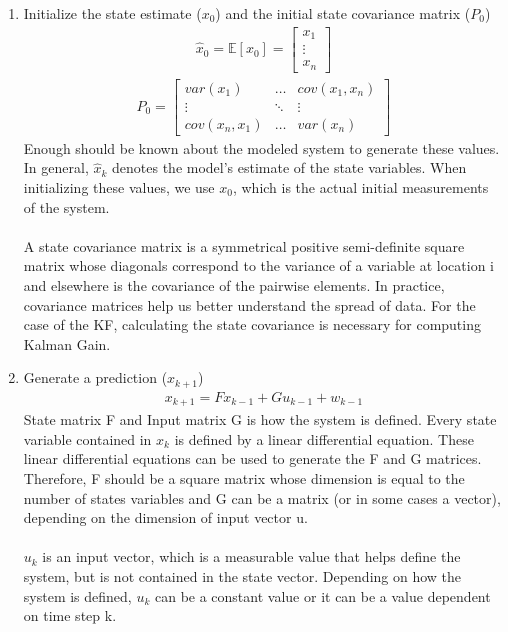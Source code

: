 \begin{enumerate}
  \item Initialize the state estimate ($x_0$) and the initial state covariance matrix ($P_0$) 
    \begin{align*}
       \hat x_0 = \mathbb{E}[x_0]  = \begin{bmatrix}
           x_1 \\
           \vdots \\
           x_n 
         \end{bmatrix} 
    \end{align*}
  \begin{align*}
      P_0 =
      \begin{bmatrix}
           var(x_1)  & \hdots & cov(x_1,x_n) \\
           \vdots & \ddots & \vdots \\
           cov(x_n, x_1)  & \hdots & var(x_n )
         \end{bmatrix} 
  \end{align*}
  Enough should be known about the modeled system to generate these values. In general, $\hat x_k$ denotes the model's estimate of the state variables. When initializing these values, we use $x_0$, which is the actual initial measurements of the system. \\ \\
   A state covariance matrix is a symmetrical positive semi-definite square matrix whose diagonals correspond to the variance of a variable at location i and elsewhere is the covariance of the pairwise elements. In practice, covariance matrices help us better understand the spread of data. For the case of the KF, calculating the state covariance is necessary for computing Kalman Gain. 
  \item Generate a prediction ($x_{k+1}$)
  \begin{align*}
      x_{k+1} = F x_{k-1} +  G u_{k-1} + w_{k-1} 
  \end{align*} 
  State matrix F and Input matrix G is how the system is defined. Every state variable contained in $x_k$ is defined by a linear differential equation. These linear differential equations can be used to generate the F and G matrices. Therefore, F should be a square matrix whose dimension is equal to the number of states variables and G can be a matrix (or in some cases a vector), depending on the dimension of input vector u. \\ \\
  $u_k$  is an input vector, which is a measurable value that helps define the system, but is not contained in the state vector. Depending on how the system is defined, $u_k$  can be a constant value or it can be a value dependent on time step k. \\ \\

\end{enumerate}
